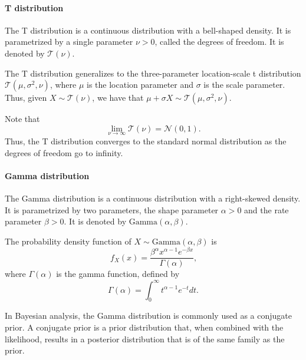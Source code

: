 \paragraph{T distribution} The T distribution is a continuous distribution with a
bell-shaped density.  It is parametrized by a single parameter $\nu > 0$, called the
degrees of freedom.  It is denoted by $\mathcal{T}(\nu)$.


The T distribution generalizes to the three-parameter location-scale t distribution
$\mathcal{T}(\mu, \sigma^2, \nu)$, where $\mu$ is the location parameter and $\sigma$ is
the scale parameter.  Thus, given $X \sim \mathcal{T}(\nu)$, we have that
$\mu + \sigma X \sim \mathcal{T}(\mu, \sigma^2, \nu)$.

Note that $$\lim_{\nu \rightarrow \infty} \mathcal{T}(\nu) = \mathcal{N}(0, 1)\text{.}$$
Thus, the T distribution converges to the standard normal distribution as the degrees of
freedom go to infinity.

\paragraph{Gamma distribution} The Gamma distribution is a continuous distribution with a
right-skewed density.  It is parametrized by two parameters, the shape parameter $\alpha
> 0$ and the rate parameter $\beta > 0$.  It is denoted by $\text{Gamma}(\alpha, \beta)$.

The probability density function of $X \sim \text{Gamma}(\alpha, \beta)$ is
\begin{equation}
  \label{eq:gamma}
  f_X(x) = \frac{\beta^\alpha x^{\alpha - 1} e^{-\beta x}}{\Gamma(\alpha)}\text{,}
\end{equation}
where $\Gamma(\alpha)$ is the gamma function, defined by
\begin{equation}
  \label{eq:gammaf}
  \Gamma(\alpha) = \int_0^\infty t^{\alpha - 1} e^{-t} dt\text{.}
\end{equation}

In Bayesian analysis, the Gamma distribution is commonly used as a conjugate prior.
A conjugate prior is a prior distribution that, when combined with the likelihood,
results in a posterior distribution that is of the same family as the prior.

